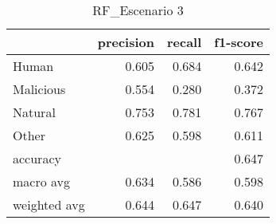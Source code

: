 \begin{table}
\centering
\caption{RF_Escenario 3}
\label{tab:Reporte de clasificación para el Escenario 3 utilizando Random Forest}
\begin{tabular}{lrrr}
\toprule
{} &  precision &  recall &  f1-score \\
\midrule
Human        &      0.605 &   0.684 &     0.642 \\
Malicious    &      0.554 &   0.280 &     0.372 \\
Natural      &      0.753 &   0.781 &     0.767 \\
Other        &      0.625 &   0.598 &     0.611 \\
accuracy     &            &         &     0.647 \\
macro avg    &      0.634 &   0.586 &     0.598 \\
weighted avg &      0.644 &   0.647 &     0.640 \\
\bottomrule
\end{tabular}
\end{table}
